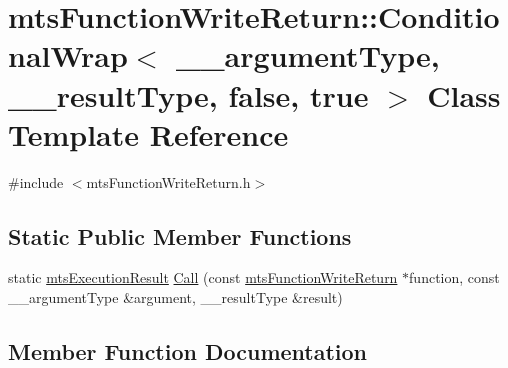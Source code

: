 \hypertarget{classmts_function_write_return_1_1_conditional_wrap_3_01____argument_type_00_01____result_type_00_01false_00_01true_01_4}{}\section{mts\+Function\+Write\+Return\+:\+:Conditional\+Wrap$<$ \+\_\+\+\_\+argument\+Type, \+\_\+\+\_\+result\+Type, false, true $>$ Class Template Reference}
\label{classmts_function_write_return_1_1_conditional_wrap_3_01____argument_type_00_01____result_type_00_01false_00_01true_01_4}


{\ttfamily \#include $<$mts\+Function\+Write\+Return.\+h$>$}

\subsection*{Static Public Member Functions}
\begin{DoxyCompactItemize}
\item 
static \hyperlink{classmts_execution_result}{mts\+Execution\+Result} \hyperlink{classmts_function_write_return_1_1_conditional_wrap_3_01____argument_type_00_01____result_type_00_01false_00_01true_01_4_a764b0f30f553f16aac7f0c16c2022f9f}{Call} (const \hyperlink{classmts_function_write_return}{mts\+Function\+Write\+Return} $\ast$function, const \+\_\+\+\_\+argument\+Type \&argument, \+\_\+\+\_\+result\+Type \&result)
\end{DoxyCompactItemize}


\subsection{Member Function Documentation}
\hypertarget{classmts_function_write_return_1_1_conditional_wrap_3_01____argument_type_00_01____result_type_00_01false_00_01true_01_4_a764b0f30f553f16aac7f0c16c2022f9f}{}
